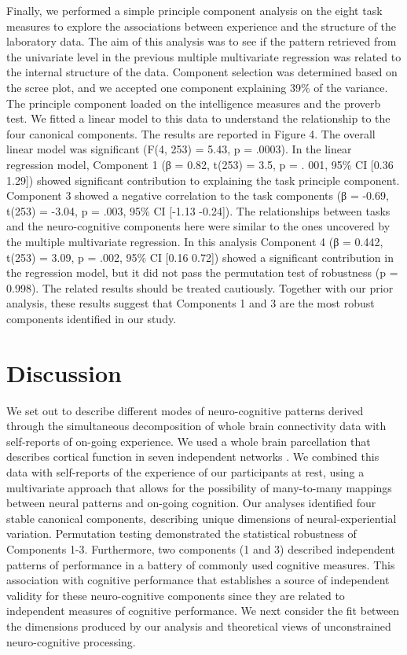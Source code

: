 Finally, we performed a simple principle component analysis on the eight task measures to explore the associations between experience and the structure of the laboratory data. The aim of this analysis was to see if the pattern retrieved from the univariate level in the previous multiple multivariate regression was related to the internal structure of the data. Component selection was determined based on the scree plot, and we accepted one component explaining 39\% of the variance. The principle component loaded on the intelligence measures and the proverb test. We fitted a linear model to this data to understand the relationship to the four canonical components. The results are reported in Figure 4. The overall linear model was significant (F(4, 253) = 5.43, p = .0003). In the linear regression model, Component 1 (β = 0.82, t(253) = 3.5, p = . 001, 95\% CI [0.36 1.29]) showed significant contribution to explaining the task principle component. Component 3 showed a negative correlation to the task components (β = -0.69, t(253) = -3.04, p = .003, 95\% CI [-1.13 -0.24]). The relationships between tasks and the neuro-cognitive components here were similar to the ones uncovered by the multiple multivariate regression. In this analysis Component 4 (β = 0.442, t(253) = 3.09, p = .002, 95\% CI [0.16 0.72]) showed a significant contribution in the regression model, but it did not pass the permutation test of robustness (p = 0.998). The related results should be treated cautiously. Together with our prior analysis, these results suggest that Components 1 and 3 are the most robust components identified in our study.


\section{Discussion}
\label{study2:discussion}
We set out to describe different modes of neuro-cognitive patterns derived through the simultaneous decomposition of whole brain connectivity data with self-reports of on-going experience. We used a whole brain parcellation that describes cortical function in seven independent networks \cite{Yeo2011}.
We combined this data with self-reports of the experience of our participants at rest, using a multivariate approach that allows for the possibility of many-to-many mappings between neural patterns and on-going cognition. Our analyses identified four stable canonical components, describing unique dimensions of neural-experiential variation. Permutation testing demonstrated the statistical robustness of Components 1-3. Furthermore, two components (1 and 3) described independent patterns of performance in a battery of commonly used cognitive measures. This association with cognitive performance that establishes a source of independent validity for these neuro-cognitive components since they are related to independent measures of cognitive performance. We next consider the fit between the dimensions produced by our analysis and theoretical views of unconstrained neuro-cognitive processing.

